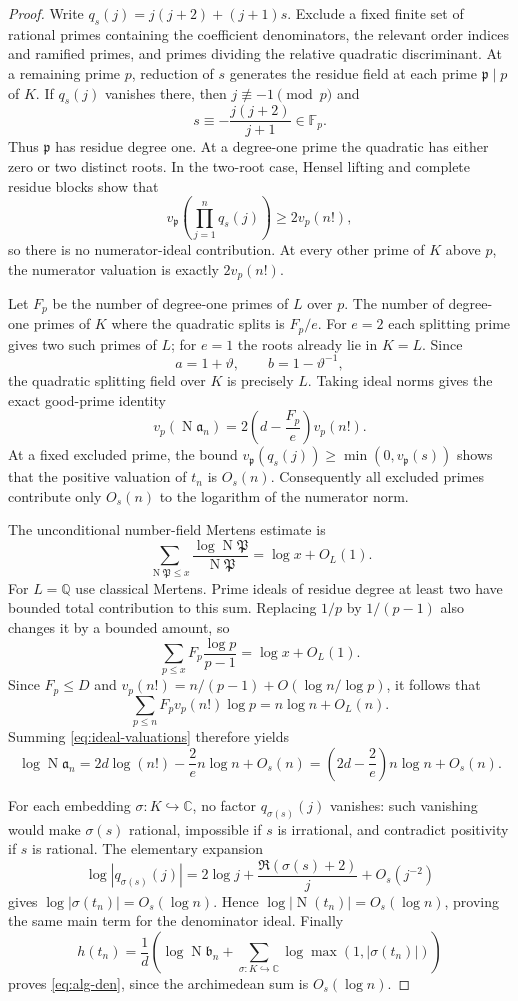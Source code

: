 \documentclass[11pt]{article}
\theoremstyle{remark}
\newcommand{\Q}{\mathbb Q}
\newcommand{\C}{\mathbb C}
\DeclareMathOperator{\Norm}{N}
\begin{document}
\begin{proof}
Write $q_s(j)=j(j+2)+(j+1)s$. Exclude a fixed finite set of rational
primes containing the coefficient denominators, the relevant order
indices and ramified primes, and primes dividing the relative
quadratic discriminant. At a remaining prime $p$, reduction of $s$
generates the residue field at each prime $\mathfrak p\mid p$ of $K$.
If $q_s(j)$ vanishes there, then $j\not\equiv-1\pmod p$ and
\[
 s\equiv-\frac{j(j+2)}{j+1}\in\mathbb F_p.
\]
Thus $\mathfrak p$ has residue degree one. At a degree-one prime
the quadratic has either zero or two distinct roots. In the two-root
case, Hensel lifting and complete residue blocks show that
\[
 v_{\mathfrak p}\!\left(\prod_{j=1}^nq_s(j)\right)
 \ge2v_p(n!),
\]
so there is no numerator-ideal contribution. At every other prime
of $K$ above $p$, the numerator valuation is exactly $2v_p(n!)$.

Let $F_p$ be the number of degree-one primes of $L$ over $p$.
The number of degree-one primes of $K$ where the quadratic splits
is $F_p/e$. For $e=2$ each splitting prime gives two such primes
of $L$; for $e=1$ the roots already lie in $K=L$. Since
\[
 a=1+\vartheta,\qquad b=1-\vartheta^{-1},
\]
the quadratic splitting field over $K$ is precisely $L$. Taking
ideal norms gives the exact good-prime identity
\begin{equation}\label{eq:ideal-valuations}
 v_p(\Norm\mathfrak a_n)
 =2\left(d-\frac{F_p}{e}\right)v_p(n!).
\end{equation}
At a fixed excluded prime, the bound
$v_{\mathfrak p}(q_s(j))\ge\min(0,v_{\mathfrak p}(s))$
shows that the positive valuation of $t_n$ is $O_s(n)$.
Consequently all excluded primes contribute only $O_s(n)$ to the
logarithm of the numerator norm.

The unconditional number-field Mertens estimate\cite[Theorem 1,
\textnormal{(A1)--(A2)}]{GarciaLee} is
\[
 \sum_{\Norm\mathfrak P\le x}
 \frac{\log\Norm\mathfrak P}{\Norm\mathfrak P}
 =\log x+O_L(1).
\]
For $L=\Q$ use classical Mertens. Prime ideals of residue degree
at least two have bounded total contribution to this sum. Replacing
$1/p$ by $1/(p-1)$ also changes it by a bounded amount, so
\[
 \sum_{p\le x}F_p\frac{\log p}{p-1}=\log x+O_L(1).
\]
Since $F_p\le D$ and
$v_p(n!)=n/(p-1)+O(\log n/\log p)$, it follows that
\[
 \sum_{p\le n}F_pv_p(n!)\log p=n\log n+O_L(n).
\]
Summing \eqref{eq:ideal-valuations} therefore yields
\[
 \log\Norm\mathfrak a_n
 =2d\log(n!)-\frac2e n\log n+O_s(n)
 =\left(2d-\frac2e\right)n\log n+O_s(n).
\]

For each embedding $\sigma:K\hookrightarrow\C$, no factor
$q_{\sigma(s)}(j)$ vanishes: such vanishing would make $\sigma(s)$
rational, impossible if $s$ is irrational, and contradict positivity
if $s$ is rational. The elementary expansion
\[
 \log|q_{\sigma(s)}(j)|
 =2\log j+\frac{\Re(\sigma(s)+2)}j+O_s(j^{-2})
\]
gives $\log|\sigma(t_n)|=O_s(\log n)$. Hence
$\log|\Norm(t_n)|=O_s(\log n)$, proving the same main term for
the denominator ideal. Finally
\[
 h(t_n)=\frac1d\left(\log\Norm\mathfrak b_n+
       \sum_{\sigma:K\hookrightarrow\C}\log\max(1,|\sigma(t_n)|)\right)
\]
proves \eqref{eq:alg-den}, since the archimedean sum is $O_s(\log n)$.
\end{proof}
\end{document}

